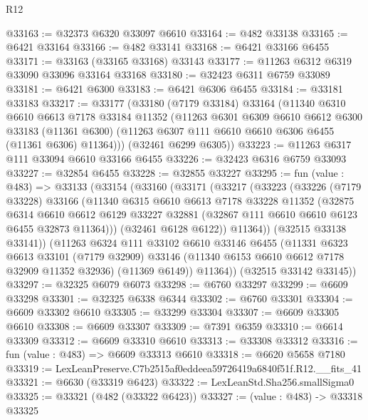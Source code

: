 \begin{lexlean}{R12}
\begin{coremodule}
@33163 := @32373 @6320 @33097 @6610
@33164 := @482 @33138
@33165 := @6421 @33164
@33166 := @482 @33141
@33168 := @6421 @33166 @6455
@33171 := @33163 (@33165 @33168) @33143
@33177 := @11263 @6312 @6319 @33090 @33096 @33164 @33168
@33180 := @32423 @6311 @6759 @33089
@33181 := @6421 @6300
@33183 := @6421 @6306 @6455
@33184 := @33181 @33183
@33217 := @33177
    (@33180
      (@7179 @33184)
      @33164
      (@11340
        @6310
        @6610
        @6613
        @7178
        @33184
        @11352
        (@11263
          @6301
          @6309
          @6610
          @6612
          @6300
          @33183
          (@11361 @6300)
          (@11263 @6307 @111 @6610 @6610 @6306 @6455 (@11361 @6306) @11364)))
      (@32461 @6299 @6305))
@33223 := @11263 @6317 @111 @33094 @6610 @33166 @6455
@33226 := @32423 @6316 @6759 @33093
@33227 := @32854 @6455
@33228 := @32855 @33227
@33295 := fun (value : @483) =>
  @33133
    (@33154
      (@33160
        (@33171
          (@33217
            (@33223
              (@33226
                (@7179 @33228)
                @33166
                (@11340
                  @6315
                  @6610
                  @6613
                  @7178
                  @33228
                  @11352
                  (@32875
                    @6314
                    @6610
                    @6612
                    @6129
                    @33227
                    @32881
                    (@32867 @111 @6610 @6610 @6123 @6455 @32873 @11364)))
                (@32461 @6128 @6122))
              @11364))
          (@32515 @33138 @33141))
        (@11263
          @6324
          @111
          @33102
          @6610
          @33146
          @6455
          (@11331
            @6323
            @6613
            @33101
            (@7179 @32909)
            @33146
            (@11340 @6153 @6610 @6612 @7178 @32909 @11352 @32936)
            (@11369 @6149))
          @11364))
      (@32515 @33142 @33145))
@33297 := @32325 @6079 @6073
@33298 := @6760 @33297
@33299 := @6609 @33298
@33301 := @32325 @6338 @6344
@33302 := @6760 @33301
@33304 := @6609 @33302 @6610
@33305 := @33299 @33304
@33307 := @6609 @33305 @6610
@33308 := @6609 @33307
@33309 := @7391 @6359
@33310 := @6614 @33309
@33312 := @6609 @33310 @6610
@33313 := @33308 @33312
@33316 := fun (value : @483) => @6609 @33313 @6610
@33318 := @6620 @5658 @7180
@33319 := LexLeanPreserve.C7b2515af0eddeea59726419a6840f51f.R12.__fits_41
@33321 := @6630 (@33319 @6423)
@33322 := LexLeanStd.Sha256.smallSigma0
@33325 := @33321 (@482 (@33322 @6423))
@33327 := (value : @483) -> @33318 @33325

\end{coremodule}
\end{lexlean}
